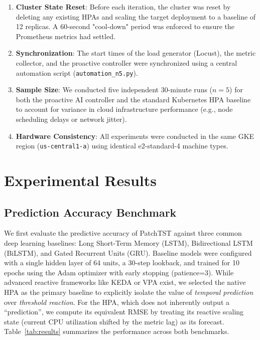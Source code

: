\documentclass[conference]{IEEEtran}
\begin{document}
\begin{enumerate}
    \item \textbf{Cluster State Reset}: Before each iteration, the cluster was reset by deleting any existing HPAs and scaling the target deployment to a baseline of 12 replicas. A 60-second "cool-down" period was enforced to ensure the Prometheus metrics had settled.
    \item \textbf{Synchronization}: The start times of the load generator (Locust), the metric collector, and the proactive controller were synchronized using a central automation script (\texttt{automation\_n5.py}).
    \item \textbf{Sample Size}: We conducted five independent 30-minute runs ($n=5$) for both the proactive AI controller and the standard Kubernetes HPA baseline to account for variance in cloud infrastructure performance (e.g., node scheduling delays or network jitter).
    \item \textbf{Hardware Consistency}: All experiments were conducted in the same GKE region (\texttt{us-central1-a}) using identical e2-standard-4 machine types.
\end{enumerate}

\section{Experimental Results}\label{sec:results}

\subsection{Prediction Accuracy Benchmark}
We first evaluate the predictive accuracy of PatchTST against three common deep learning baselines: Long Short-Term Memory (LSTM), Bidirectional LSTM (BiLSTM), and Gated Recurrent Units (GRU). Baseline models were configured with a single hidden layer of 64 units, a 30-step lookback, and trained for 10 epochs using the Adam optimizer with early stopping (patience=3). While advanced reactive frameworks like KEDA or VPA exist, we selected the native HPA as the primary baseline to explicitly isolate the value of \textit{temporal prediction} over \textit{threshold reaction}. For the HPA, which does not inherently output a ``prediction'', we compute its equivalent RMSE by treating its reactive scaling state (current CPU utilization shifted by the metric lag) as its forecast. Table~\ref{tab:results} summarizes the performance across both benchmarks.
\end{document}
